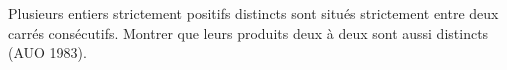Plusieurs entiers strictement positifs distincts sont situés strictement entre deux carrés consécutifs. Montrer que leurs produits deux à deux sont aussi distincts (AUO 1983).
